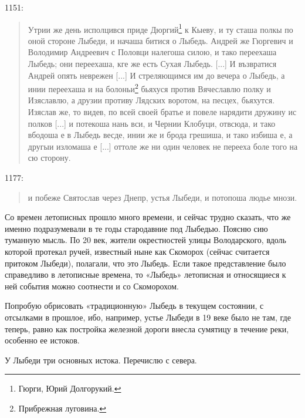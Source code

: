 1151:

\begin{quotation}
\noindent Утрии же день исполцився приде Дюргий\footnote{Гюрги, Юрий Долгорукий.} к Кыеву, и ту сташа полкы по оной стороне Лыбеди, и начаша битися о Лыбедь. Андрей же Гюргевич и Володимир Андреевич с Половци налегоша силою, и тако переехаша Лыбедь; они переехаша, кге же есть Сухая Лыбедь. [...]
И възвратися Андрей опять неврежен [...] И стреляющимся им до вечера о Лыбедь, а инии переехаша и на болоньи\footnote{Прибрежная луговина.} бьяхуся против Вячеславлю полку и Изяславлю, а друзии противу Лядских воротом, на песцех, бьяхутся. Изяслав же, то видев, по всей своей братье и повеле нарядити дружину ис полков [...] и потекоша нань вси, и Чернии Клобуци, отвсюда, и тако вбодоша е в Лыбедь весде, инии же и брода грешиша, и тако избиша е, а другыи изломаша е [...] оттоле же ни один человек не перееха боле того на сю сторону.
\end{quotation}

1177:

\begin{quotation}
\noindent и побеже Святослав через Днепр, устья Лыбеди, и потопоша людье мнози.
\end{quotation}

Со времен летописных прошло много времени, и сейчас трудно сказать, что же именно подразумевали в те годы стародавние под Лыбедью. Поясню сию туманную мысль. По 20 век, жители окрестностей улицы Володарского, вдоль которой протекал ручей, известный ныне как Скоморох (сейчас считается притоком Лыбеди), полагали, что это Лыбедь. Если такое представление было справедливо в летописные времена, то «Лыбедь» летописная и относящиеся к ней события можно соотнести и со Скоморохом.

Попробую обрисовать «традиционную» Лыбедь в текущем состоянии, с отсылками в прошлое, ибо, например, устье Лыбеди в 19 веке было не там, где теперь, равно как постройка железной дороги внесла сумятицу в течение реки, особенно ее истоков.

У Лыбеди три основных истока. Перечислю с севера.

